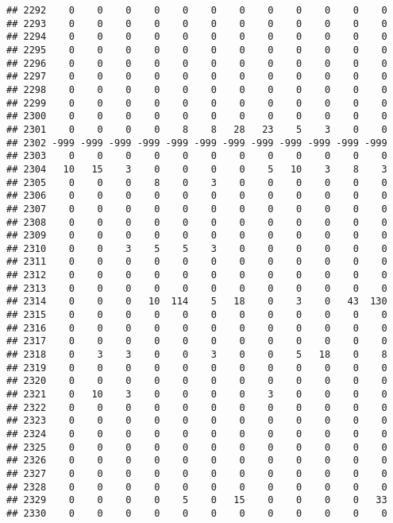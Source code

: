 \documentclass[]{article}
\begin{document}
\begin{verbatim}
## 2292    0    0    0    0    0    0    0    0    0    0    0    0
## 2293    0    0    0    0    0    0    0    0    0    0    0    0
## 2294    0    0    0    0    0    0    0    0    0    0    0    0
## 2295    0    0    0    0    0    0    0    0    0    0    0    0
## 2296    0    0    0    0    0    0    0    0    0    0    0    0
## 2297    0    0    0    0    0    0    0    0    0    0    0    0
## 2298    0    0    0    0    0    0    0    0    0    0    0    0
## 2299    0    0    0    0    0    0    0    0    0    0    0    0
## 2300    0    0    0    0    0    0    0    0    0    0    0    0
## 2301    0    0    0    0    8    8   28   23    5    3    0    0
## 2302 -999 -999 -999 -999 -999 -999 -999 -999 -999 -999 -999 -999
## 2303    0    0    0    0    0    0    0    0    0    0    0    0
## 2304   10   15    3    0    0    0    0    5   10    3    8    3
## 2305    0    0    0    8    0    3    0    0    0    0    0    0
## 2306    0    0    0    0    0    0    0    0    0    0    0    0
## 2307    0    0    0    0    0    0    0    0    0    0    0    0
## 2308    0    0    0    0    0    0    0    0    0    0    0    0
## 2309    0    0    0    0    0    0    0    0    0    0    0    0
## 2310    0    0    3    5    5    3    0    0    0    0    0    0
## 2311    0    0    0    0    0    0    0    0    0    0    0    0
## 2312    0    0    0    0    0    0    0    0    0    0    0    0
## 2313    0    0    0    0    0    0    0    0    0    0    0    0
## 2314    0    0    0   10  114    5   18    0    3    0   43  130
## 2315    0    0    0    0    0    0    0    0    0    0    0    0
## 2316    0    0    0    0    0    0    0    0    0    0    0    0
## 2317    0    0    0    0    0    0    0    0    0    0    0    0
## 2318    0    3    3    0    0    3    0    0    5   18    0    8
## 2319    0    0    0    0    0    0    0    0    0    0    0    0
## 2320    0    0    0    0    0    0    0    0    0    0    0    0
## 2321    0   10    3    0    0    0    0    3    0    0    0    0
## 2322    0    0    0    0    0    0    0    0    0    0    0    0
## 2323    0    0    0    0    0    0    0    0    0    0    0    0
## 2324    0    0    0    0    0    0    0    0    0    0    0    0
## 2325    0    0    0    0    0    0    0    0    0    0    0    0
## 2326    0    0    0    0    0    0    0    0    0    0    0    0
## 2327    0    0    0    0    0    0    0    0    0    0    0    0
## 2328    0    0    0    0    0    0    0    0    0    0    0    0
## 2329    0    0    0    0    5    0   15    0    0    0    0   33
## 2330    0    0    0    0    0    0    0    0    0    0    0    0

\end{verbatim}
\end{document}
